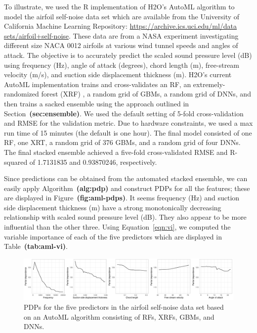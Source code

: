 \documentclass[12pt]{article}
\def\ref#1{\textbf{(#1)}}
\begin{document}
To illustrate, we used the R implementation of H2O's AutoML algorithm to model the airfoil self-noise data set \citep{uciml} which are available from the University of California Machine Learning Repository: \url{https://archive.ics.uci.edu/ml/data sets/airfoil+self-noise}. These data are from a NASA experiment investigating different size NACA 0012 airfoils at various wind tunnel speeds and angles of attack. The objective is to accurately predict the scaled sound pressure level (dB) using frequency (Hz), angle of attack (degrees), chord length (m), free-stream velocity (m/s), and suction side displacement thickness (m). H2O's current AutoML implementation trains and cross-validates an RF, an extremely-randomized forest (XRF) \citep{extremely-geurts-2006}, a random grid of GBMs, a random grid of DNNs, and then trains a sacked ensemble using the approach outlined in Section~\ref{sec:ensemble}. We used the default setting of 5-fold cross-validation and RMSE for the validation metric. Due to hardware constraints, we used a max run time of 15 minutes (the default is one hour). The final model consisted of one RF, one XRT, a random grid of 376 GBMs, and a random grid of four DNNs. The final stacked ensemble achieved a five-fold cross-validated RMSE and R-squared of 1.7131835 and 0.93870246, respectively.

Since predictions can be obtained from the automated stacked ensemble, we can easily apply Algorithm~\ref{alg:pdp} and construct PDPs for all the features; these are displayed in Figure~\ref{fig:aml-pdps}. It seems frequency (Hz) and suction side displacement thickness (m) have a strong monotonically decreasing relationship with scaled sound pressure level (dB). They also appear to be more influential than the other three. Using Equation~\eqref{eqn:vi}, we computed the variable importance of each of the five predictors which are displayed in Table~\ref{tab:aml-vi}. 

\begin{figure}[!htb]
  \centering
  \includegraphics[width=1.0\textwidth]{aml_pdps}
  \caption{PDPs for the five predictors in the airfoil self-noise data set based on an AutoML algorithm consisting of RFs, XRFs, GBMs, and DNNs. \label{fig:aml-pdps}}
\end{figure}
\end{document}

